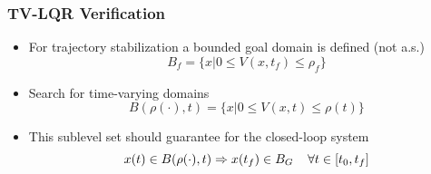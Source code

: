 \documentclass{beamer}
\begin{document}
\begin{frame}
\frametitle{TV-LQR Verification}
\begin{itemize}
\item For trajectory stabilization a bounded goal domain is defined (not a.s.)
\begin{equation*}
B_f=\{ x|0\leq V(x,t_f) \leq \rho_f \} 
\end{equation*} 
\item Search for time-varying domains 
\begin{equation*}
B(\rho (\cdot ), t)=\{ x|0\leq V(x,t) \leq \rho (t) \} 
\end{equation*} 
\item This sublevel set should guarantee for the closed-loop system
\begin{equation*}
x(t) \in B( \rho (\cdot ), t) \Rightarrow x(t_f) \in B_G \hspace{.4cm} \forall t \in [ t_0, t_f ]
\end{equation*}
\end{itemize}

\end{frame}

\end{document}
